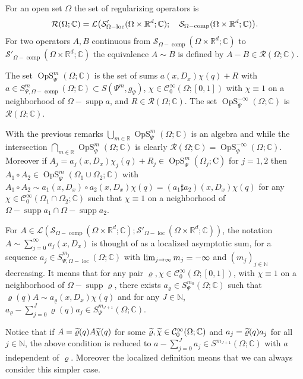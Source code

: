 \documentclass[AHL,Unicode,longabstracts]{cedram}
\newcommand{\C}{\mathbb{C}}
\newcommand{\R}{\mathbb{R}}
\newcommand{\N}{\mathbb{N}}
\newcommand{\rmC}{\mathrm{C}}
\newcommand{\clC}{\mathcal{C}}
\newcommand{\clS}{\mathcal{S}}
\newcommand{\clL}{\mathcal{L}}
\newcommand{\clR}{\mathcal{R}}
\DeclareMathOperator{\OpS}{OpS}
\DeclareMathOperator{\ccomp}{comp}
\DeclareMathOperator{\suppp}{supp}
\DeclareMathOperator{\locc}{loc}
\let\oldtilde\tilde
\renewcommand*{\tilde}[1]{\mathchoice{\widetilde{#1}}{\widetilde{#1}}{\oldtilde{#1}}{\oldtilde{#1}}}
\let\originalleft\left
\let\originalright\right
\renewcommand{\left}{\mathopen{}\mathclose\bgroup\originalleft}
\renewcommand{\right}{\aftergroup\egroup\originalright}
\renewcommand*{\to}{\mathchoice{\longrightarrow}{\rightarrow}{\rightarrow}{\rightarrow}}
\begin{document}
\begin{defi}\label{def:ROmega}
For an open set $\Omega$ the set of regularizing operators is
\[
\clR(\Omega;\C)=\clL\left(\clS'_{\Omega-\locc}(\Omega\times\R^{d};\C);\quad \clS_{\Omega-\ccomp}(\Omega\times\R^{d};\C)\right).
\]
For two operators $A,B$ continuous from $\clS_{\Omega-\ccomp}(\Omega\times\R^{d};\C)$ to $\clS'_{\Omega-\ccomp}(\Omega\times\R^{d};\C)$ the equivalence $A\sim B$ is defined by $A-B\in \clR(\Omega;\C)$.

The set $\OpS^{m}_{\Psi}(\Omega;\C)$ is the set of sums $a(x,D_{x})\chi(q)+R$ with $a\in S^{m}_{\Psi,\Omega-\ccomp}(\Omega;\C)\subset S(\Psi^{m},g_{\Psi})$, $\chi\in \clC^{\infty}_{0}(\Omega;[0,1])$ with $\chi\equiv 1$ on a neighborhood of $\Omega-\suppp a$, and $R\in \clR(\Omega;\C)$. The set $\OpS^{-\infty}_{\Psi}(\Omega;\C)$ is $\clR(\Omega;\C)$.
\end{defi}

With the previous remarks $\bigcup_{m\in \R}\OpS^{m}_{\Psi}(\Omega;\C)$ is an algebra and while the intersection $\bigcap_{m\in \R}\OpS^{m}_{\Psi}(\Omega;\C)$ is clearly $\clR(\Omega;\C)=\OpS^{-\infty}_{\Psi}(\Omega;\C)$. Moreover if $A_{j}=a_{j}(x,D_{x})\chi_{j}(q)+R_{j}\in \OpS^{m}_{\Psi}(\Omega_{j};\rmC)$ for $j=1,2$ then $A_{1}\circ A_{2}\in \OpS^{m}_{\Psi}(\Omega_{1}\cup \Omega_{2};\C)$ with $A_{1}\circ A_{2}\sim a_{1}(x,D_{x})\circ a_{2}(x,D_{x})\chi(q)=(a_{1}\sharp a_{2})(x,D_{x})\chi(q)$ for any $\chi\in \clC^{\infty}_{0}(\Omega_{1}\cap \Omega_{2};\C)$ such that $\chi\equiv 1$ on a neighborhood of $\Omega-\suppp a_{1}\cap \Omega-\suppp a_{2}$.

\begin{defi}\label{def:asympsum}
For $A\in \clL(\clS_{\Omega-\ccomp}(\Omega\times\R^{d};\C);\clS'_{\Omega-\locc}(\Omega\times\R^{d};\C))$, the notation $A\sim \sum_{j=0}^{\infty}a_{j}(x,D_{x})$ is thought of as a localized asymptotic sum, for a sequence $a_{j}\in S^{m_{j}}_{\Psi,\Omega-\locc}(\Omega;\C)$ with $\lim_{j\to\infty}m_{j}=-\infty$ and $(m_{j})_{j\in\N}$ decreasing. It means that for any pair $\varrho,\chi\in \clC^{\infty}_{0}(\Omega;[0,1])$, with $\chi\equiv 1$ on a neighborhood of $\Omega-\suppp\varrho$, there exists $a_{\varrho}\in S^{m_{0}}_{\Psi}(\Omega;\C)$ such that $\varrho(q)A\sim a_{\varrho}(x,D_{x})\chi(q)$ and for any $J\in \N$, $a_{\varrho}-\sum_{j=0}^{J}\varrho(q)a_{j}\in S^{m_{J+1}}_{\Psi}(\Omega;\C)$.
\end{defi}

Notice that if $A=\tilde{\varrho}(q)A\tilde{\chi}(q)$ for some $\tilde{\varrho},\tilde{\chi}\in \clC^{\infty}_{0}(\Omega;\C)$ and $a_{j}=\tilde{\varrho}(q)a_{j}$ for all $j\in\N$, the above condition is reduced to $a-\sum_{j=0}^{J}a_{j}\in S^{m_{J+1}}(\Omega;\C)$ with $a$ independent of $\varrho$. Moreover the localized definition means that we can always consider this simpler case.
\end{document}
